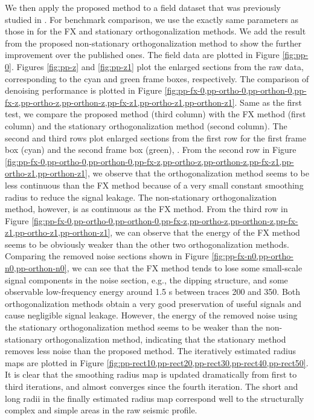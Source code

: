 We then apply the proposed method to a field dataset that was previously studied in \cite{yangkang2015ortho}. For benchmark comparison, we use the exactly same parameters as those in \cite{yangkang2015ortho} for the FX and stationary orthogonalization methods. We add the result from the proposed non-stationary orthogonalization method to show the further improvement over the published ones. The field data are plotted in Figure \ref{fig:pp-0}. Figures \ref{fig:pp-z} and \ref{fig:pp-z1} plot the enlarged sections from the raw data, corresponding to the cyan and green frame boxes, respectively. The comparison of denoising performance is plotted in Figure \ref{fig:pp-fx-0,pp-ortho-0,pp-orthon-0,pp-fx-z,pp-ortho-z,pp-orthon-z,pp-fx-z1,pp-ortho-z1,pp-orthon-z1}. Same as the first test, we compare the proposed method (third column) with the FX method (first column) and the stationary orthogonalization method (second column). The second and third rows plot enlarged sections from the first row for the first frame box (cyan) and the second frame box (green), . From the second row in Figure \ref{fig:pp-fx-0,pp-ortho-0,pp-orthon-0,pp-fx-z,pp-ortho-z,pp-orthon-z,pp-fx-z1,pp-ortho-z1,pp-orthon-z1}, we observe that the orthogonalization method seems to be less continuous than the FX method because of a very small constant smoothing radius to reduce the signal leakage. The non-stationary orthogonalization method, however, is as continuous as the FX method. From the third row in Figure \ref{fig:pp-fx-0,pp-ortho-0,pp-orthon-0,pp-fx-z,pp-ortho-z,pp-orthon-z,pp-fx-z1,pp-ortho-z1,pp-orthon-z1}, we can observe that the energy of the FX method seems to be obviously weaker than the other two orthogonalization methods. Comparing the removed noise sections shown in Figure \ref{fig:pp-fx-n0,pp-ortho-n0,pp-orthon-n0}, we can see that the FX method tends to lose some small-scale signal components in the noise section, e.g., the dipping structure, and some observable low-frequency energy around 1.5 s between traces 200 and 350.  Both orthogonalization methods obtain a very good preservation of useful signals and cause negligible signal leakage. However, the energy of the removed noise using the stationary orthogonalization method seems to be weaker than the non-stationary orthogonalization method, indicating that the stationary method removes less noise than the proposed method. The iteratively estimated radius maps are plotted in Figure \ref{fig:pp-rect10,pp-rect20,pp-rect30,pp-rect40,pp-rect50}. It is clear that the smoothing radius map is updated dramatically from  first to  third iterations, and almost converges since the fourth iteration. The short and long radii in the finally estimated radius map correspond well to the structurally complex and simple areas in the raw seismic profile. 

